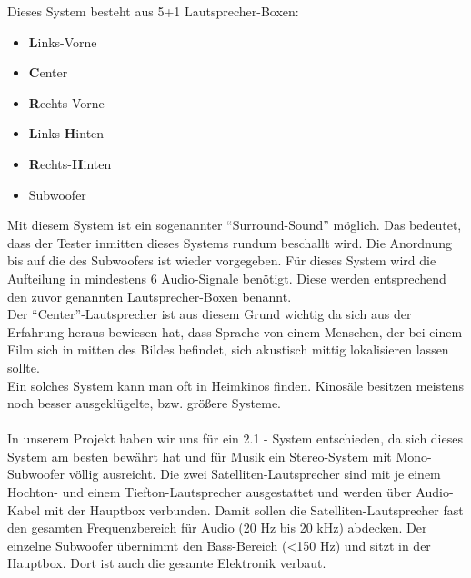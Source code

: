 Dieses System besteht aus 5+1 Lautsprecher-Boxen:
\begin{itemize}
	\item \textbf{L}inks-Vorne
	\item \textbf{C}enter
	\item \textbf{R}echts-Vorne
	\item \textbf{L}inks-\textbf{H}inten
	\item \textbf{R}echts-\textbf{H}inten
	\item Subwoofer
\end{itemize}
Mit diesem System ist ein sogenannter \enquote{Surround-Sound} möglich.
Das bedeutet, dass der Tester inmitten dieses Systems rundum beschallt wird.
Die Anordnung bis auf die des Subwoofers ist wieder vorgegeben.
Für dieses System wird die Aufteilung in mindestens 6 Audio-Signale benötigt.
Diese werden entsprechend den zuvor genannten Lautsprecher-Boxen benannt.\\
Der \enquote{Center}-Lautsprecher ist aus diesem Grund wichtig da sich aus der Erfahrung heraus bewiesen hat, dass Sprache von einem Menschen, der bei einem Film sich in mitten des Bildes befindet, sich akustisch mittig lokalisieren lassen sollte.\\ 
Ein solches System kann man oft in Heimkinos finden.
Kinosäle besitzen meistens noch besser ausgeklügelte, bzw. größere Systeme.
\\ \\


In unserem Projekt haben wir uns für ein 2.1 - System entschieden, da sich dieses System am besten bewährt hat und für Musik ein Stereo-System mit Mono-Subwoofer völlig ausreicht.
Die zwei Satelliten-Lautsprecher sind mit je einem Hochton- und einem Tiefton-Lautsprecher ausgestattet und werden über Audio-Kabel mit der Hauptbox verbunden.
Damit sollen die Satelliten-Lautsprecher fast den gesamten Frequenzbereich für Audio (20 Hz bis 20 kHz) abdecken.
Der einzelne Subwoofer übernimmt den Bass-Bereich (<150 Hz) und sitzt in der Hauptbox.
Dort ist auch die gesamte Elektronik verbaut.


\newpage
